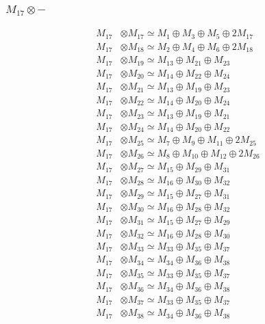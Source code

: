 \subsubsection{$ M_{17}\otimes -$}
\begin{align*}
M_{17} &\otimes M_{17} \simeq M_{1} \oplus M_{3} \oplus M_{5} \oplus 2M_{17} \\
M_{17} &\otimes M_{18} \simeq M_{2} \oplus M_{4} \oplus M_{6} \oplus 2M_{18} \\
M_{17} &\otimes M_{19} \simeq M_{13} \oplus M_{21} \oplus M_{23} \\
M_{17} &\otimes M_{20} \simeq M_{14} \oplus M_{22} \oplus M_{24} \\
M_{17} &\otimes M_{21} \simeq M_{13} \oplus M_{19} \oplus M_{23} \\
M_{17} &\otimes M_{22} \simeq M_{14} \oplus M_{20} \oplus M_{24} \\
M_{17} &\otimes M_{23} \simeq M_{13} \oplus M_{19} \oplus M_{21} \\
M_{17} &\otimes M_{24} \simeq M_{14} \oplus M_{20} \oplus M_{22} \\
M_{17} &\otimes M_{25} \simeq M_{7} \oplus M_{9} \oplus M_{11} \oplus 2M_{25} \\
M_{17} &\otimes M_{26} \simeq M_{8} \oplus M_{10} \oplus M_{12} \oplus 2M_{26} \\
M_{17} &\otimes M_{27} \simeq M_{15} \oplus M_{29} \oplus M_{31} \\
M_{17} &\otimes M_{28} \simeq M_{16} \oplus M_{30} \oplus M_{32} \\
M_{17} &\otimes M_{29} \simeq M_{15} \oplus M_{27} \oplus M_{31} \\
M_{17} &\otimes M_{30} \simeq M_{16} \oplus M_{28} \oplus M_{32} \\
M_{17} &\otimes M_{31} \simeq M_{15} \oplus M_{27} \oplus M_{29} \\
M_{17} &\otimes M_{32} \simeq M_{16} \oplus M_{28} \oplus M_{30} \\
M_{17} &\otimes M_{33} \simeq M_{33} \oplus M_{35} \oplus M_{37} \\
M_{17} &\otimes M_{34} \simeq M_{34} \oplus M_{36} \oplus M_{38} \\
M_{17} &\otimes M_{35} \simeq M_{33} \oplus M_{35} \oplus M_{37} \\
M_{17} &\otimes M_{36} \simeq M_{34} \oplus M_{36} \oplus M_{38} \\
M_{17} &\otimes M_{37} \simeq M_{33} \oplus M_{35} \oplus M_{37} \\
M_{17} &\otimes M_{38} \simeq M_{34} \oplus M_{36} \oplus M_{38} \\

\end{align*}
